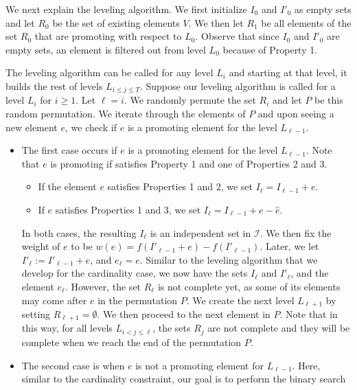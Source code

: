 \documentclass[11pt]{article}
\newcommand{\marginalgain}[2]{f(#2 + #1) - f(#2)}
\begin{document}
We next explain the leveling algorithm. 
We first initialize $I_{0}$ and $I'_0$ as empty sets and let $R_0$ be the set of existing elements $V$.
We then let $R_1$ be all elements of the set $R_0$ that are promoting with respect to $L_0$. 
Observe that since $I_0 $ and $I'_0$ are empty sets, an element is  
filtered out from level $L_0$ because of Property 1.

The leveling algorithm can be called for any level $L_i$ and starting at that level, 
it builds the rest of levels $L_{i \le j \le T}$. 
Suppose our leveling algorithm is called for a level $L_i$ for $i \ge 1$. 
Let $\ell=i$.
We randomly permute the set $R_i$ and let $P$ be this random permutation. 
We iterate through the elements of $P$ and upon seeing a new element $e$, 
we check if $e$ is a promoting element for the level $L_{\ell - 1}$. 
\begin{itemize}
    \item The first case occurs if $e$ is a promoting  element for the level $L_{\ell - 1}$. 
    Note that $e$ is promoting if satisfies Property 1 and one of Properties 2 and 3.
        \begin{itemize}
            \item If the element $e$ satisfies Properties 1 and 2,  we set $I_{\ell} = I_{\ell - 1} + e$.
            \item If $e$ satisfies Properties 1 and 3, we set $I_{\ell} = I_{\ell - 1} + e - \hat{e}$.
        \end{itemize}        
        In both cases, the resulting $I_{\ell}$ is an independent set in $\mathcal{I}$. 
        We then fix the weight of $e$ to be $w(e) = \marginalgain{e}{I'_{\ell-1}}$. 
        Later, we let $I'_{\ell} := I'_{\ell - 1} + e$, and $e_{\ell} = e$. 
        Similar to the leveling algorithm that we develop for the cardinality case, 
        we now have the sets $I_{\ell}$ and $I'_{\ell}$, and the element $e_{\ell}$.
        However, the set $R_{\ell}$ is not complete yet, as some of its elements may come after $e$ in the permutation $P$. 
        We create the next level $L_{\ell+1}$ by setting $R_{\ell+1} = \emptyset$. 
        We then proceed to the next element in $P$. 
        Note that in this way, for all levels $L_{i < j \le \ell}$, the sets $R_j$ are 
        not complete and they will be complete when we reach the end of the permutation $P$. 
    \item The second case is when $e$ is not a promoting element for $L_{\ell - 1}$. 
    Here, similar to the cardinality constraint, our goal is to perform the binary search 

\end{itemize}
\end{document}
